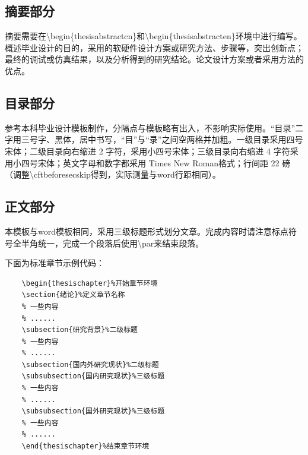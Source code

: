 \begin{thesischapter}
    \subsection{摘要部分}
    摘要需要在\textbackslash begin\{thesisabstractcn\}和\textbackslash begin\{thesisabstracten\}环境中进行编写。概述毕业设计的目的，采用的软硬件设计方案或研究方法、步骤等，突出创新点；最终的调试或仿真结果，以及分析得到的研究结论。论文设计方案或者采用方法的优点。
    \subsection{目录部分}
    参考本科毕业设计模板制作，分隔点与模板略有出入，不影响实际使用。“目录”二字用三号字、黑体，居中书写，“目”与“录”之间空两格并加粗。一级目录采用四号宋体；二级目录向右缩进 2 字符，采用小四号宋体；三级目录向右缩进 4 字符采用小四号宋体；英文字母和数字都采用 Times New Roman格式；行间距 22 磅（调整\textbackslash cftbeforesecskip得到，实际测量与word行距相同）。
    \subsection{正文部分}
    本模板与word模板相同，采用三级标题形式划分文章。完成内容时请注意标点符号全半角统一，完成一个段落后使用\textbackslash par来结束段落。\par
    下面为标准章节示例代码：\par
    \begin{Verbatim}
    \begin{thesischapter}%开始章节环境
    \section{绪论}%定义章节名称
    % 一些内容
    % ......
    \subsection{研究背景}%二级标题
    % 一些内容
    % ......
    \subsection{国内外研究现状}%二级标题
    \subsubsection{国内研究现状}%三级标题
    % 一些内容
    % ......
    \subsubsection{国外研究现状}%三级标题
    % 一些内容
    % ......
    \end{thesischapter}%结束章节环境
    \end{Verbatim}

\end{thesischapter}

